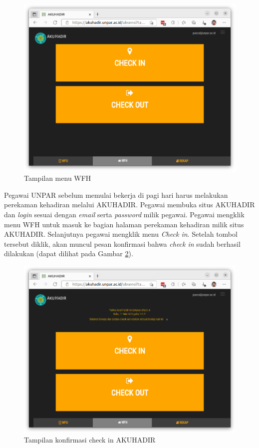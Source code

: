 \begin{figure}[H]
	\centering
	\includegraphics[scale=0.25]{Gambar/akuhadir-2-wfh.png}
	\caption{Tampilan menu WFH} 
	\label{fig:akuhadir-2-wfh}
\end{figure}
Pegawai UNPAR sebelum memulai bekerja di pagi hari harus melakukan perekaman kehadiran melalui AKUHADIR. Pegawai membuka situs AKUHADIR dan \textit{login} sesuai dengan \textit{email} serta \textit{password} milik pegawai. Pegawai mengklik menu WFH untuk masuk ke bagian halaman perekaman kehadiran milik situs AKUHADIR. Selanjutnya pegawai mengklik menu \textit{Check in}. Setelah tombol tersebut diklik, akan muncul pesan konfirmasi bahwa \textit{check in} sudah berhasil dilakukan (dapat dilihat pada Gambar \ref{fig:akuhadir-3-wfh-checkin}).

\begin{figure}[H]
	\centering
	\includegraphics[scale=0.25]{Gambar/akuhadir-3-wfh-checkin.png}
	\caption{Tampilan konfirmasi check in AKUHADIR} 
	\label{fig:akuhadir-3-wfh-checkin}
\end{figure}

